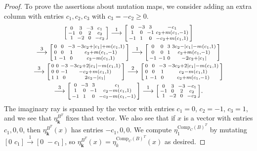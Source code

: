 \documentclass{amsart}
\theoremstyle{definition}
\theoremstyle{remark}
\numberwithin{equation}{section}
\newcommand{\0}{{\mathbf{0}}}
\newcommand{\Comp}{\mathrm{Comp}_C}
\newcommand{\kk}{\mathbf{k}}
\begin{document}
\begin{proof}
To prove the assertions about mutation maps, we consider adding an extra column with entries $c_1,c_2,c_3$ with $c_3=-c_2\ge0$.
\begin{multline*}
\begin{bsmallmatrix*}
0&3&-3&c_1\\
-1&0&2&c_2\\
1&-2&0&-c_2
\end{bsmallmatrix*}
\overset{1}{\longrightarrow}
\begin{bsmallmatrix*}
0&-3&3&-c_1\\
1&0&-1&c_2+m(c_1,-1)\\
-1&1&0&-c_2+m(c_1,1)
\end{bsmallmatrix*}\\
\overset{3}{\longrightarrow}
\begin{bsmallmatrix*}
0&0&-3&-3c_2+|c_1|+m(c_1,1)\\
0&0&1&c_2+m(c_1,-1)\\
1&-1&0&c_2-m(c_1,1)
\end{bsmallmatrix*}
\overset{1}{\longrightarrow}
\begin{bsmallmatrix*}
0&0&3&3c_2-|c_1|-m(c_1,1)\\
0&0&1&c_2+m(c_1,-1)\\
-1&-1&0&-2c_2+|c_1|
\end{bsmallmatrix*}\\
\overset{3}{\longrightarrow}
\begin{bsmallmatrix*}
0&0&-3&-3c_2+2|c_1|-m(c_1,1)\\
0&0&-1&-c_2+m(c_1,1)\\
1&1&0&2c_2-|c_1|
\end{bsmallmatrix*}
\overset{2}{\longrightarrow}
\begin{bsmallmatrix*}
0&0&-3&-3c_2+2|c_1|-m(c_1,1)\\
0&0&1&c_2-m(c_1,1)\\
1&-1&0&c_2+m(c_1,-1)
\end{bsmallmatrix*}\\
\overset{3}{\longrightarrow}
\begin{bsmallmatrix*}
0&-3&3&c_1\\
1&0&-1&c_2-m(c_1,1)\\
-1&1&0&-c_2-m(c_1,-1)
\end{bsmallmatrix*}
\overset{1}{\longrightarrow}
\begin{bsmallmatrix*}
0&3&-3&-c_1\\
-1&0&2&c_2\\
1&-2&0&-c_2
\end{bsmallmatrix*}.
\end{multline*}
The imaginary ray is spanned by the vector with entries $c_1=0$, $c_2=-1$, $c_3=1$, and we see that $\eta^{B^T}_\kk$ fixes that vector.
We also see that if $x$ is a vector with entries $c_1,0,0$, then $\eta_\kk^{B^T}(x)$ has entries $-c_1,0,0$.
We compute $\eta_1^{\Comp(B)^T}$ by mutating $[0\,\,c_1]\overset{1}{\longrightarrow}[0\,\,-c_1]$, so $\eta^{B^T}_\kk(x)=\eta^{\Comp(B)^T}_k(x)$ as desired.


\end{proof}
\end{document}
